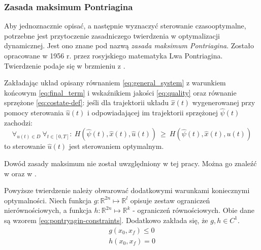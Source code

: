 \subsubsection{Zasada maksimum Pontriagina}
\label{sub:toc-def-pontriagin}

Aby jednoznacznie opisać, a następnie wyznaczyć sterowanie czasooptymalne, potrzebne jest przytoczenie zasadniczego twierdzenia w optymalizacji dynamicznej. Jest ono znane pod nazwą \emph{zasada maksimum Pontriagina}. Zostało opracowane w 1956 r. przez rosyjskiego matematyka Lwa Pontriagina. Twierdzenie podaje się w brzmieniu z \cite{Korytowski2015}.

\begin{pontriagin-max}\label{the:pontryagin}
    Zakładając układ opisany równaniem \ref{eq:general_system} z warunkiem końcowym \ref{eq:final_term} i wskaźnikiem jakości \ref{eq:quality} oraz równanie sprzężone \ref{eq:costate-def}:
    jeśli dla trajektorii układu $\hat{x}(t)$ wygenerowanej przy pomocy sterowania $\hat{u}(t)$ i odpowiadającej im trajektorii sprzężonej $\hat{\psi}(t)$ zachodzi:
    \begin{equation}\label{eq:pontriagin}
    \forall_{u(t) \in D}~ \forall_{t \in [0, T]}:~ H(\hat{\psi}(t), \hat{x}(t), \hat{u}(t)) ~ \geq ~ H(\hat{\psi}(t), \hat{x}(t), u(t))
    \end{equation}
    to sterowanie $\hat{u}(t)$ jest sterowaniem optymalnym.
\end{pontriagin-max}

Dowód zasady maksimum nie został uwzględniony w tej pracy. Można go znaleźć w \cite{Korytowski2015} oraz w \cite{Evans}.

Powyższe twierdzenie należy obwarować dodatkowymi warunkami koniecznymi optymalności. Niech funkcja $g: \mathbb{R}^{2n} \longmapsto \mathbb{R}^{l}$ opisuje zestaw ograniczeń nierównościowych, a funkcja $h: \mathbb{R}^{2n} \longmapsto \mathbb{R}^{k}$ - ograniczeń równościowych. Obie dane są wzorem \ref{eq:pontryagin-constraints}. Dodatkowo zakłada się, że $g, h \in C^{1}$.
\begin{equation}\label{eq:pontryagin-constraints}
    \begin{array}{lr}
    g(x_{0}, x_{f}) \leq 0 \\
    h(x_{0}, x_{f}) = 0
    \end{array}
\end{equation}

